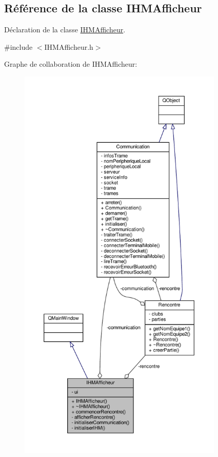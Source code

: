 \hypertarget{class_i_h_m_afficheur}{}\subsection{Référence de la classe I\+H\+M\+Afficheur}
\label{class_i_h_m_afficheur}


Déclaration de la classe \hyperlink{class_i_h_m_afficheur}{I\+H\+M\+Afficheur}.  




{\ttfamily \#include $<$I\+H\+M\+Afficheur.\+h$>$}



Graphe de collaboration de I\+H\+M\+Afficheur\+:
\nopagebreak
\begin{figure}[H]
\begin{center}
\leavevmode
\includegraphics[height=550pt]{class_i_h_m_afficheur__coll__graph}
\end{center}
\end{figure}
